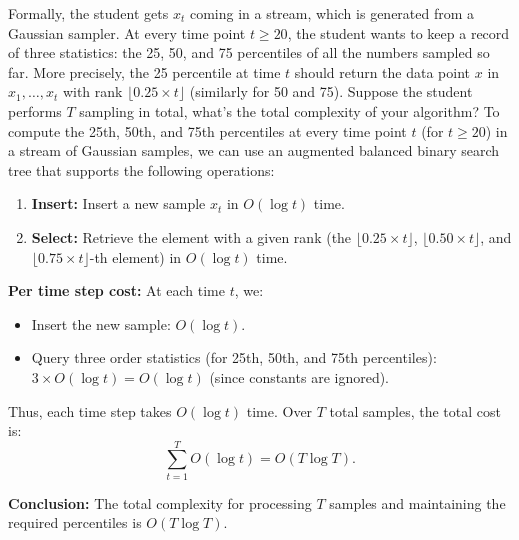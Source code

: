 \documentclass[letterpaper, 11pt]{article}
\newcommand{\1}{\mathds{1}}	%
\theoremstyle{definition}
\newenvironment{solution}{{\par\noindent\it Solution.}}{}
\begin{document}
Formally, the student gets $x_t$ coming in a stream, which is generated from a Gaussian sampler. At every time point $t \geq 20$, the student wants to keep a record of three statistics: the 25, 50, and 75 percentiles of all the numbers sampled so far. More precisely, the 25 percentile at time $t$ should return the data point $x$ in $x_1, \ldots, x_t$ with rank $\lfloor 0.25 \times t \rfloor$ (similarly for 50 and 75). Suppose the student performs $T$ sampling in total, what's the total complexity of your algorithm?
\begin{solution}
    To compute the 25th, 50th, and 75th percentiles at every time point \( t \) (for \( t \ge 20 \)) in a stream of Gaussian samples, we can use an augmented balanced binary search tree  that supports the following operations:
    \begin{enumerate}
        \item \textbf{Insert:} Insert a new sample \( x_t \) in \( O(\log t) \) time.
        \item \textbf{Select:} Retrieve the element with a given rank (the \( \lfloor 0.25\times t \rfloor\), \( \lfloor 0.50\times t \rfloor\), and \( \lfloor 0.75\times t \rfloor \)-th element) in \( O(\log t) \) time.
    \end{enumerate}
    
    \textbf{Per time step cost:}  
    At each time \( t \), we:
    \begin{itemize}
        \item Insert the new sample: \( O(\log t) \).
        \item Query three order statistics (for 25th, 50th, and 75th percentiles): \( 3 \times O(\log t) = O(\log t) \) (since constants are ignored).
    \end{itemize}
    
    Thus, each time step takes \( O(\log t) \) time. Over \( T \) total samples, the total cost is:
    \[
    \sum_{t=1}^{T} O(\log t) = O(T \log T).
    \]
    
    \textbf{Conclusion:}  
    The total complexity for processing \( T \) samples and maintaining the required percentiles is \( O(T \log T) \).\end{solution}
\newpage
\end{document}
